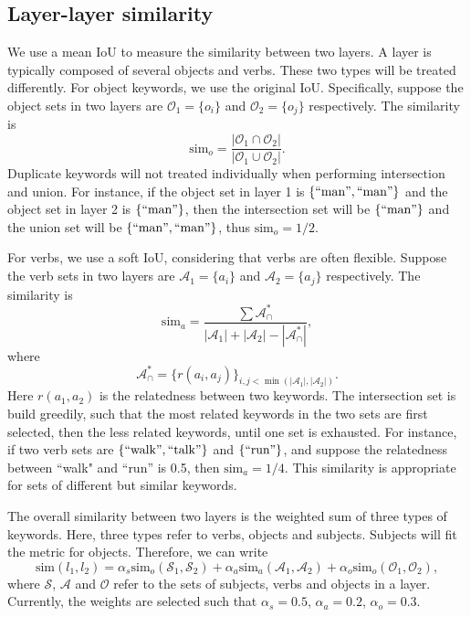 \documentclass{article} %
\begin{document}
\subsection{Layer-layer similarity}
We use a mean IoU to measure the similarity between two layers. A layer is typically composed of several objects and verbs. These two types will be treated differently. For object keywords, we use the original IoU. Specifically, suppose the object sets in two layers are $\mathcal{O}_1=\{o_i\}$ and $\mathcal{O}_2=\{o_j\}$ respectively. The similarity is
$$
\mathrm{sim}_o = \frac{|\mathcal{O}_1\cap\mathcal{O}_2|}{|\mathcal{O}_1\cup \mathcal{O}_2|}.
$$
Duplicate keywords will not treated individually when performing intersection and union. For instance, if the object set in layer 1 is $\{\mathrm{``man"},\mathrm{``man"}\}$ and the object set in layer 2 is $\{\mathrm{``man"}\}$, then the intersection set will be $\{\mathrm{``man"}\}$ and the union set will be $\{\mathrm{``man"},\mathrm{``man"}\}$, thus $\mathrm{sim}_o = 1/2$.

For verbs, we use a soft IoU, considering that verbs are often flexible. Suppose the verb sets in two layers are $\mathcal{A}_1=\{a_i\}$ and $\mathcal{A}_2=\{a_j\}$ respectively. The similarity is
$$
\mathrm{sim}_a = \frac{\sum\mathcal{A}^*_\cap}{|\mathcal{A}_1|+|\mathcal{A}_2| - |\mathcal{A}^*_\cap|},
$$
where
$$
\mathcal{A}^*_\cap = \{r(a_i, a_j)\}_{i,j<\min(|\mathcal{A}_1|,|\mathcal{A}_2|)}.
$$
Here $r(a_1,a_2)$ is the relatedness between two keywords. The intersection set is build greedily, such that the most related keywords in the two sets are first selected, then the less related keywords, until one set is exhausted. For instance, if two verb sets are $\{\mathrm{``walk"},\mathrm{``talk"}\}$ and $\{\mathrm{``run"}\}$, and suppose the relatedness between ``walk" and ``run'' is 0.5, then $\mathrm{sim}_a = 1/4$. This similarity is appropriate for sets of different but similar keywords.

The overall similarity between two layers is the weighted sum of three types of keywords. Here, three types refer to verbs, objects and subjects. Subjects will fit the metric for objects. Therefore, we can write
$$
\mathrm{sim}(l_1,l_2) = \alpha_s \mathrm{sim}_o(\mathcal{S}_1, \mathcal{S}_2) + \alpha_a \mathrm{sim}_a(\mathcal{A}_1, \mathcal{A}_2) + \alpha_o \mathrm{sim}_o(\mathcal{O}_1, \mathcal{O}_2),
$$
where $\mathcal{S}$, $\mathcal{A}$ and $\mathcal{O}$ refer to the sets of subjects, verbs and objects in a layer. Currently, the weights are selected such that $\alpha_s = 0.5$, $\alpha_a = 0.2$, $\alpha_o = 0.3$.
\end{document}
